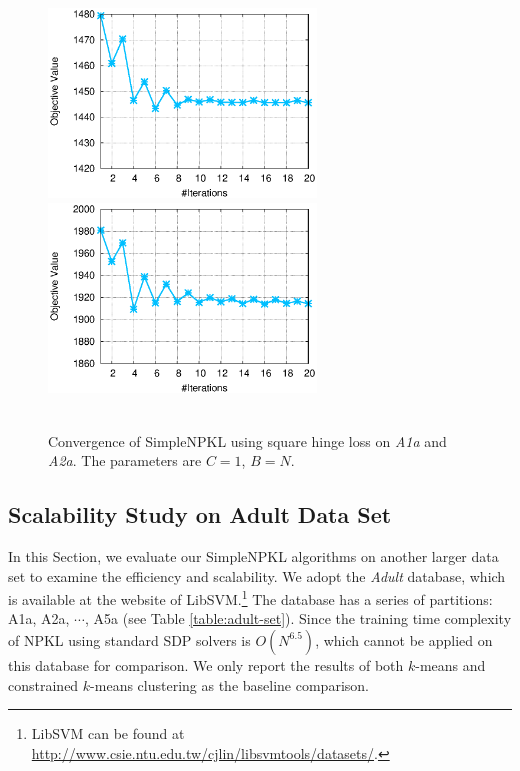 \begin{figure}[!t]
\begin{center}
\includegraphics[width=2.8in]{figures/a1a_cnvrgnc.eps}
\includegraphics[width=2.8in]{figures/a2a_cnvrgnc.eps}
{\footnotesize{}~~~~~~~~~~~~~~~~~~~~~~~~~~~~~~~~~~~~~~~~~}
\caption{Convergence of SimpleNPKL using square
hinge loss on {\em A1a} and {\em A2a}.
The parameters are $C=1$, $B=N$.} \label{fig:convergence}
\end{center}
\vskip -0.1in
\end{figure}

\subsection{Scalability Study on Adult Data Set}

In this Section, we evaluate our SimpleNPKL algorithms on another larger data set to
examine the efficiency and scalability. We adopt the {\em Adult} database, which is
available at the website of
LibSVM.\footnote{LibSVM can be found at \url{http://www.csie.ntu.edu.tw/cjlin/libsvmtools/datasets/}.} The
database has a series of partitions: A1a, A2a, $\cdots$, A5a (see Table
\ref{table:adult-set}). Since the training time complexity of NPKL using standard
SDP solvers is $O(N^{6.5})$, which cannot be applied on this database for
comparison. We only report the results of both $k$-means and constrained $k$-means clustering as the baseline
comparison.

